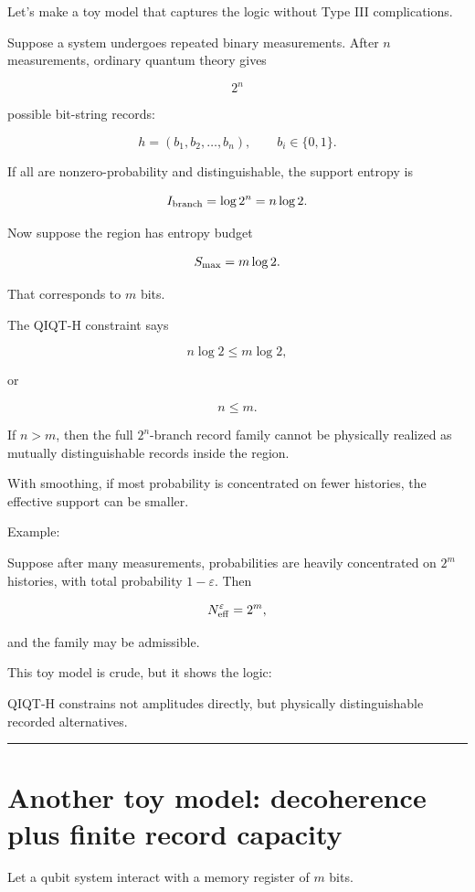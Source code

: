 \documentclass[11pt,a4paper]{article}
\newenvironment{qiqtquote}{\begin{mdframed}[style=quotestyle]}{\end{mdframed}}
\begin{document}
Let’s make a toy model that captures the logic without Type III complications.

Suppose a system undergoes repeated binary measurements. After $n$ measurements, ordinary quantum theory gives

\[
2^n
\]

possible bit-string records:

\[
h=(b_1,b_2,\dots,b_n),
\qquad b_i\in\{0,1\}.
\]

If all are nonzero-probability and distinguishable, the support entropy is

\[
I_{\rm branch}= \log 2^n = n\log 2.
\]

Now suppose the region has entropy budget

\[
S_{\rm max}=m\log 2.
\]

That corresponds to $m$ bits.

The QIQT-H constraint says

\[
n\log 2 \leq m\log 2,
\]

or

\[
n\leq m.
\]

If $n>m$, then the full $2^n$-branch record family cannot be physically realized as mutually distinguishable records inside the region.

With smoothing, if most probability is concentrated on fewer histories, the effective support can be smaller.

Example:

Suppose after many measurements, probabilities are heavily concentrated on $2^m$ histories, with total probability $1-\varepsilon$. Then

\[
N^\varepsilon_{\rm eff}=2^m,
\]

and the family may be admissible.

This toy model is crude, but it shows the logic:

\begin{qiqtquote}
QIQT-H constrains not amplitudes directly, but physically distinguishable recorded alternatives.
\end{qiqtquote}

\medskip\hrule\medskip

\section{Another toy model: decoherence plus finite record capacity}

Let a qubit system interact with a memory register of $m$ bits.
\end{document}
